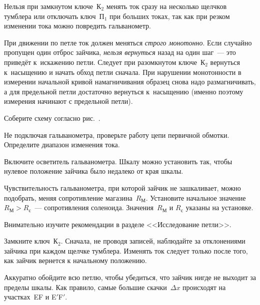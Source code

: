 Нельзя при замкнутом ключе~К$_2$ менять ток сразу на несколько щелчков тумблера или
отключать ключ~$\text{П}_1$ при больших токах, так как при резком изменении
тока можно повредить гальванометр.

При движении по петле ток должен меняться \emph{строго монотонно}.
Если случайно пропущен один отброс зайчика, \emph{нельзя вернуться}
назад на один шаг~--- это приведёт к~искажению петли. Следует при разомкнутом
ключе~К$_2$ вернуться к~насыщению и начать обход петли сначала. 
При нарушении монотонности в измерении начальной кривой
намагничивания образец снова надо размагничивать, а для предельной петли
достаточно вернуться к~насыщению (именно поэтому измерения начинают с предельной
петли).

\begin{lab:task}



	\item Соберите схему согласно рис.~.

	\item Не подключая гальванометра, проверьте работу цепи первичной обмотки.
Определите диапазон изменения тока.

	\item Включите осветитель гальванометра. Шкалу можно установить так, чтобы нулевое
    положение зайчика было недалеко от края шкалы.
    
    Чувствительность гальванометра, при которой зайчик не зашкаливает,
можно подобрать, меняя сопротивление магазина~$R_{М}$. Установите начальное значение~$R_М>R_{с}$~--- сопротивления
соленоида. Значения~$R_{М}$ и $R_{с}$ указаны на установке.

	
	\begin{lab:warning}
		Внимательно изучите рекомендации в разделе <<Исследование петли>>.
	\end{lab:warning}

	\item Замкните ключ~К$_2$. Сначала, не проводя записей, наблюдайте за
отклонениями зайчика при каждом щелчке тумблера. Изменять ток следует только
после того, как зайчик вернется к начальному положению.

	Аккуратно обойдите всю петлю, чтобы убедиться, что зайчик нигде не выходит
за пределы шкалы. Как правило, самые большие скачки~$\Delta x$ происходят 
на участках~EF и E$'$F$'$.


\end{lab:task}
